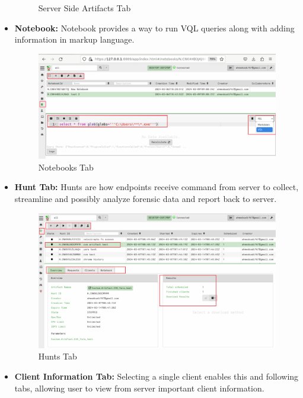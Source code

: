 \documentclass[a4paper, 11pt, oneside]{article} %
\begin{document}
\begin{itemize}
\begin{figure}[H]
        \caption{Server Side Artifacts Tab}
        \label{fig:GUIhome7}
    \end{figure}
    \item \textbf{Notebook:} Notebook provides a way to run VQL queries along with adding information in markup language.
    \begin{figure}[H]
        \centering
        \includegraphics[scale=0.35]{img/GUI/home/8.png}
        \caption{Notebooks Tab}
        \label{fig:GUIhome8}
    \end{figure}
    \item \textbf{Hunt Tab:} Hunts are how endpoints receive command from server to collect, streamline and possibly analyze forensic data and report back to server.
    \begin{figure}[H]
        \centering
        \includegraphics[scale=0.35]{img/GUI/home/5.png}
        \caption{Hunts Tab}
        \label{fig:GUIhome5}
    \end{figure}
    \item \textbf{Client Information Tab:} Selecting a single client enables this and following tabs, allowing user to view from server important client information.
    \begin{figure}[H]
        \centering

\end{figure}
\end{itemize}
\end{document}
